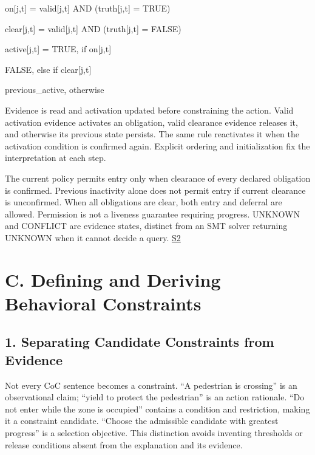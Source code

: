 \documentclass[11pt,a4paper]{article}
\begin{document}
\begingroup\small\ttfamily\setlength{\parskip}{1pt}
\noindent\hspace*{0.0em}on[j,t] = valid[j,t] AND (truth[j,t] = TRUE)\par
\noindent\hspace*{0.0em}clear[j,t] = valid[j,t] AND (truth[j,t] = FALSE)\par
\noindent\hspace*{0.0em}active[j,t] = TRUE,             if on[j,t]\par
\noindent\hspace*{7.0em}FALSE,           else if clear[j,t]\par
\noindent\hspace*{7.0em}previous\_\allowbreak{}active, otherwise\par\endgroup\par

Evidence is read and activation updated before constraining the action. Valid activation evidence activates an obligation, valid clearance evidence releases it, and otherwise its previous state persists. The same rule reactivates it when the activation condition is confirmed again. Explicit ordering and initialization fix the interpretation at each step.\par

The current policy permits entry only when clearance of every declared obligation is confirmed. Previous inactivity alone does not permit entry if current clearance is unconfirmed. When all obligations are clear, both entry and deferral are allowed. Permission is not a liveness guarantee requiring progress. UNKNOWN and CONFLICT are evidence states, distinct from an SMT solver returning UNKNOWN when it cannot decide a query. \href{\detokenize{../../../../../../platforms/eblc-bcv/src/guard_synth_eblc/action_contract.py}}{S2}\par

\section*{C. Defining and Deriving Behavioral Constraints}

\subsection*{1. Separating Candidate Constraints from Evidence}

Not every CoC sentence becomes a constraint. “A pedestrian is crossing” is an observational claim; “yield to protect the pedestrian” is an action rationale. “Do not enter while the zone is occupied” contains a condition and restriction, making it a constraint candidate. “Choose the admissible candidate with greatest progress” is a selection objective. This distinction avoids inventing thresholds or release conditions absent from the explanation and its evidence.\par
\end{document}
